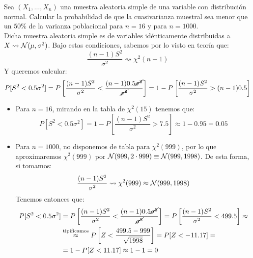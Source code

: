 \begin{ejercicio}
    Sea $(X_1, \ldots, X_n)$ una muestra aleatoria simple de una variable con distribución normal.  Calcular la probabilidad de que la cuasivarianza muestral sea menor que un $50\%$ de la varianza poblacional para $n = 16$ y para $n = 1000$.\\

    \noindent
    Dicha muestra aleatoria simple es de variables idénticamente distribuidas a $X\rightsquigarrow\mathcal{N}(\mu, \sigma^2)$. Bajo estas condiciones, sabemos por lo visto en teoría que:
    \begin{equation*}
        \dfrac{(n-1)S^2}{\sigma^2} \rightsquigarrow\chi^2(n-1)
    \end{equation*}
    Y queremos calcular:
    \begin{align*}
        P[S^2 < 0.5\sigma^2] = P\left[\dfrac{(n-1)S^2}{\sigma^2} < \dfrac{(n-1)0.5\cancel{\sigma^2}}{\cancel{\sigma^2}}\right] = 1-P\left[\dfrac{(n-1)S^2}{\sigma^2} > (n-1)0.5\right]
    \end{align*}
    \begin{itemize}
        \item Para $n=16$, mirando en la tabla de $\chi^2(15)$ tenemos que:
            \begin{equation*}
                P[S^2 < 0.5\sigma^2] = 1-P\left[\dfrac{(n-1)S^2}{\sigma^2} > 7.5\right] \approx 1-0.95 = 0.05
            \end{equation*}
        \item Para $n=1000$, no disponemos de tabla para $\chi^2(999)$, por lo que aproximaremos $\chi^2(999)$ por $\mathcal{N}(999, 2\cdot 999)\equiv \mathcal{N}(999, 1998)$. De esta forma, si tomamos:
            \begin{equation*}
                \dfrac{(n-1)S^2}{\sigma^2}\rightsquigarrow \chi^2(999) \approx \mathcal{N}(999, 1998)
            \end{equation*}
            Tenemos entonces que:
            \begin{align*}
                P[S^2 < 0.5\sigma^2] &= P\left[\dfrac{(n-1)S^2}{\sigma^2} < \dfrac{(n-1)0.5\cancel{\sigma^2}}{\cancel{\sigma^2}}\right] = P\left[\dfrac{(n-1)S^2}{\sigma^2} < 499.5\right]
                \approx \\& \stackrel{\text{tipificamos}}{\approx}
                P\left[Z < \dfrac{499.5-999}{\sqrt{1998}}\right] = P[Z < -11.17]
                =\\&= 1-P[Z<11.17] \approx 1-1 = 0
            \end{align*}
    \end{itemize}
\end{ejercicio}

